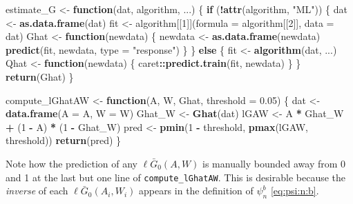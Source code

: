 \documentclass[]{article}
\newenvironment{Shaded}{\begin{snugshade}}{\end{snugshade}}
\newcommand{\ControlFlowTok}[1]{\textcolor[rgb]{0.13,0.29,0.53}{\textbf{#1}}}
\newcommand{\DataTypeTok}[1]{\textcolor[rgb]{0.13,0.29,0.53}{#1}}
\newcommand{\DecValTok}[1]{\textcolor[rgb]{0.00,0.00,0.81}{#1}}
\newcommand{\FloatTok}[1]{\textcolor[rgb]{0.00,0.00,0.81}{#1}}
\newcommand{\KeywordTok}[1]{\textcolor[rgb]{0.13,0.29,0.53}{\textbf{#1}}}
\newcommand{\NormalTok}[1]{#1}
\newcommand{\OperatorTok}[1]{\textcolor[rgb]{0.81,0.36,0.00}{\textbf{#1}}}
\newcommand{\StringTok}[1]{\textcolor[rgb]{0.31,0.60,0.02}{#1}}
\newcommand{\Gbar}{\bar{G}}
\theoremstyle{definition}
\theoremstyle{definition}
\theoremstyle{definition}
\theoremstyle{remark}
\begin{document}
\begin{Shaded}
\begin{Highlighting}[]
\NormalTok{estimate_G <-}\StringTok{ }\ControlFlowTok{function}\NormalTok{(dat, algorithm, ...) \{}
  \ControlFlowTok{if}\NormalTok{ (}\OperatorTok{!}\KeywordTok{attr}\NormalTok{(algorithm, }\StringTok{"ML"}\NormalTok{)) \{}
\NormalTok{    dat <-}\StringTok{ }\KeywordTok{as.data.frame}\NormalTok{(dat)}
\NormalTok{    fit <-}\StringTok{ }\NormalTok{algorithm[[}\DecValTok{1}\NormalTok{]](}\DataTypeTok{formula =}\NormalTok{ algorithm[[}\DecValTok{2}\NormalTok{]], }\DataTypeTok{data =}\NormalTok{ dat)}
\NormalTok{    Ghat <-}\StringTok{ }\ControlFlowTok{function}\NormalTok{(newdata) \{}
\NormalTok{      newdata <-}\StringTok{ }\KeywordTok{as.data.frame}\NormalTok{(newdata)}
      \KeywordTok{predict}\NormalTok{(fit, newdata, }\DataTypeTok{type =} \StringTok{"response"}\NormalTok{)}
\NormalTok{    \}}
\NormalTok{  \} }\ControlFlowTok{else}\NormalTok{ \{}
\NormalTok{    fit <-}\StringTok{ }\KeywordTok{algorithm}\NormalTok{(dat, ...)}
\NormalTok{    Qhat <-}\StringTok{ }\ControlFlowTok{function}\NormalTok{(newdata) \{}
\NormalTok{      caret}\OperatorTok{::}\KeywordTok{predict.train}\NormalTok{(fit, newdata)}
\NormalTok{    \}}
\NormalTok{  \}}
  \KeywordTok{return}\NormalTok{(Ghat)}
\NormalTok{\}}

\NormalTok{compute_lGhatAW <-}\StringTok{ }\ControlFlowTok{function}\NormalTok{(A, W, Ghat, }\DataTypeTok{threshold =} \FloatTok{0.05}\NormalTok{) \{}
\NormalTok{  dat <-}\StringTok{ }\KeywordTok{data.frame}\NormalTok{(}\DataTypeTok{A =}\NormalTok{ A, }\DataTypeTok{W =}\NormalTok{ W)}
\NormalTok{  Ghat_W <-}\StringTok{ }\KeywordTok{Ghat}\NormalTok{(dat)}
\NormalTok{  lGAW <-}\StringTok{ }\NormalTok{A }\OperatorTok{*}\StringTok{ }\NormalTok{Ghat_W }\OperatorTok{+}\StringTok{ }\NormalTok{(}\DecValTok{1} \OperatorTok{-}\StringTok{ }\NormalTok{A) }\OperatorTok{*}\StringTok{ }\NormalTok{(}\DecValTok{1} \OperatorTok{-}\StringTok{ }\NormalTok{Ghat_W)}
\NormalTok{  pred <-}\StringTok{ }\KeywordTok{pmin}\NormalTok{(}\DecValTok{1} \OperatorTok{-}\StringTok{ }\NormalTok{threshold, }\KeywordTok{pmax}\NormalTok{(lGAW, threshold))}
  \KeywordTok{return}\NormalTok{(pred)}
\NormalTok{\}}
\end{Highlighting}
\end{Shaded}

Note how the prediction of any \(\ell\Gbar_{0}(A,W)\) is manually
bounded away from 0 and 1 at the last but one line of
\texttt{compute\_lGhatAW}. This is desirable because the
\textit{inverse} of each \(\ell\Gbar_{0}(A_{i},W_{i})\) appears in the
definition of \(\psi_{n}^{b}\) \eqref{eq:psi:n:b}.
\end{document}
